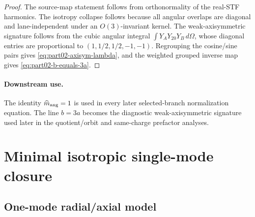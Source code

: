 \begin{proof}
The source-map statement follows from orthonormality of the real-STF harmonics.  The isotropy collapse follows because all angular overlaps are diagonal and lane-independent under an \(O(3)\)-invariant kernel.  The weak-axisymmetric signature follows from the cubic angular integral \(\int Y_A Y_{20}Y_B\,d\Omega\), whose diagonal entries are proportional to \((1,1/2,1/2,-1,-1)\).  Regrouping the cosine/sine pairs gives \eqref{eq:part02-axisym-lambda}, and the weighted grouped inverse map gives \eqref{eq:part02-b-equals-3a}.
\end{proof}

\paragraph{Downstream use.}
The identity \(\widehat m_{\rm ang}=1\) is used in every later selected-branch normalization equation.  The line \(b=3a\) becomes the diagnostic weak-axisymmetric signature used later in the quotient/orbit and same-charge prefactor analyses.

\section{Minimal isotropic single-mode closure}
\label{sec:part02_conservative_response:minimal-isotropic-single-mode-closure}

\subsection{One-mode radial/axial model}
\label{subsec:part02-stage025-one-mode-model}

